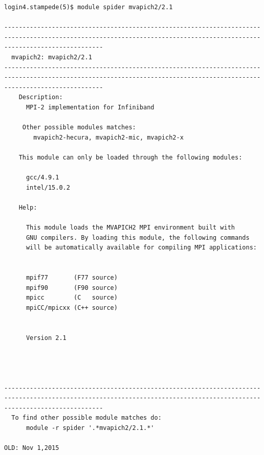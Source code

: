 \documentclass{article}
\begin{document}
\begin{verbatim}
login4.stampede(5)$ module spider mvapich2/2.1

-----------------------------------------------------------------------------------------------------------------------------------------------------------------------
  mvapich2: mvapich2/2.1
-----------------------------------------------------------------------------------------------------------------------------------------------------------------------
    Description:
      MPI-2 implementation for Infiniband 

     Other possible modules matches:
        mvapich2-hecura, mvapich2-mic, mvapich2-x

    This module can only be loaded through the following modules:

      gcc/4.9.1
      intel/15.0.2
 
    Help:
       
      This module loads the MVAPICH2 MPI environment built with
      GNU compilers. By loading this module, the following commands
      will be automatically available for compiling MPI applications:
      
      
      mpif77       (F77 source)
      mpif90       (F90 source)
      mpicc        (C   source)
      mpiCC/mpicxx (C++ source)
      
      
      Version 2.1
      
      
      

-----------------------------------------------------------------------------------------------------------------------------------------------------------------------
  To find other possible module matches do:
      module -r spider '.*mvapich2/2.1.*'

OLD: Nov 1,2015
\end{verbatim}
\normalsize
\scriptsize
\end{document}
